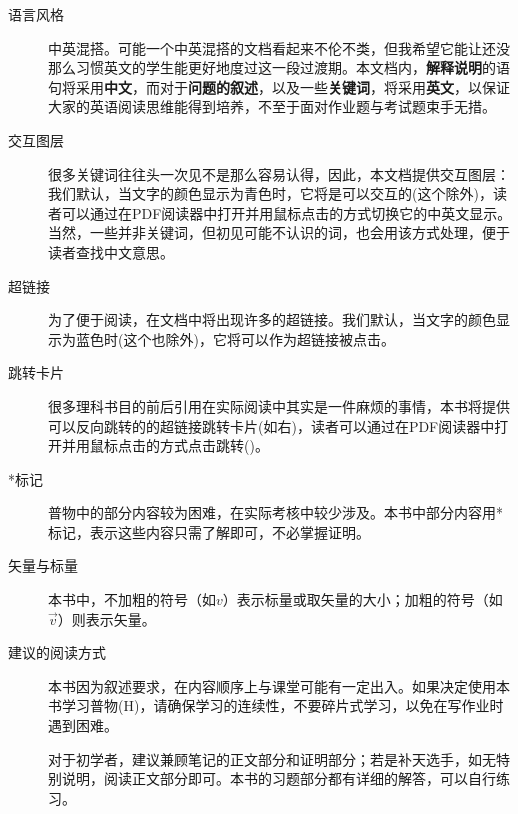 	\begin{description}
		\item[语言风格]中英混搭。可能一个中英混搭的文档看起来不伦不类，但我希望它能让还没那么习惯英文的学生能更好地度过这一段过渡期。本文档内，\textbf{解释说明}的语句将采用\textbf{中文}，而对于\textbf{问题的叙述}，以及一些\textbf{关键词}，将采用\textbf{英文}，以保证大家的英语阅读思维能得到培养，不至于面对作业题与考试题束手无措。
		\item[交互图层] 很多关键词往往头一次见不是那么容易认得，因此，本文档提供交互图层：我们默认，当文字的颜色显示为{\color{plaincyan}青色}时，它将是可以交互的(这个除外)，读者可以通过在PDF阅读器中打开并用鼠标点击的方式切换它的中英文显示。当然，一些并非关键词，但初见可能不认识的词，也会用该方式处理，便于读者查找中文意思。
		\item[超链接]为了便于阅读，在文档中将出现许多的超链接。我们默认，当文字的颜色显示为{\color{blue}蓝色}时(这个也除外)，它将可以作为超链接被点击。
		\item[跳转卡片]很多理科书目的前后引用在实际阅读中其实是一件麻烦的事情，本书将提供可以反向跳转的的超链接跳转卡片(如右)，读者可以通过在PDF阅读器中打开并用鼠标点击的方式点击跳转()。
		\item[*标记]普物中的部分内容较为困难，在实际考核中较少涉及。本书中部分内容用*标记，表示这些内容只需了解即可，不必掌握证明。
		\item [矢量与标量]本书中，不加粗的符号（如$v$）表示标量或取矢量的大小；加粗的符号（如$\vec{v}$）则表示矢量。
		\item [建议的阅读方式] 本书因为叙述要求，在内容顺序上与课堂可能有一定出入。如果决定使用本书学习普物(H)，请确保学习的连续性，不要碎片式学习，以免在写作业时遇到困难。
		
		对于初学者，建议兼顾笔记的正文部分和证明部分；若是补天选手，如无特别说明，阅读正文部分即可。本书的习题部分都有详细的解答，可以自行练习。
	\end{description}
